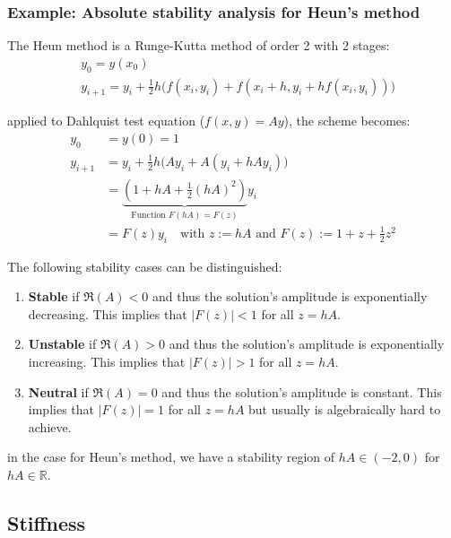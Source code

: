 \subsubsection{Example: Absolute stability analysis for Heun's method}

The Heun method is a Runge-Kutta method of order 2 with 2 stages:
\begin{align*}
    & y_0 = y(x_0) \\
    & y_{i+1}=y_{i}+{\frac{1}{2}}h\bigl(f(x_{i},y_{i})+f(x_{i}+h,y_{i}+h f(x_{i},y_{i}))\bigr)
\end{align*}

applied to Dahlquist test equation  {\color{gray}($f(x,y) = Ay$)}, the scheme becomes:
\begin{align*}
    y_0 & = y(0) = 1 \\
    y_{i+1} & = y_{i}+{\frac{1}{2}}h\bigl(Ay_{i}+A(y_i + hAy_i)\bigr) \\
    & = \underbrace{\left( 1+hA+\frac{1}{2}(hA)^2 \right)}_{\text{Function }F(hA)=F(z)}y_i \\
    & = F(z)y_i \quad\text{with }z:=hA\text{ and }F(z):=1+z+\frac{1}{2}z^2
\end{align*}

The following stability cases can be distinguished:
\begin{enumerate}
    \item{
        \textbf{Stable} if $\Re(A) < 0$ and thus the solution's amplitude is exponentially decreasing.
        This implies that \colorbox{shadecolor}{$|F(z)| < 1$} for all $z=hA$.
    }
    \item{
        \textbf{Unstable} if $\Re(A) > 0$ and thus the solution's amplitude is exponentially increasing.
        This implies that \colorbox{shadecolor}{$|F(z)| > 1$} for all $z=hA$.
    }
    \item{
        \textbf{Neutral} if $\Re(A) = 0$ and thus the solution's amplitude is constant.
        This implies that \colorbox{shadecolor}{$|F(z)| = 1$} for all $z=hA$ but usually is algebraically hard to achieve.
    }
\end{enumerate}

in the case for Heun's method, we have a stability region of
$hA\in(-2,0)$ for $hA\in\mathbb{R}$.

\subsection{Stiffness}

